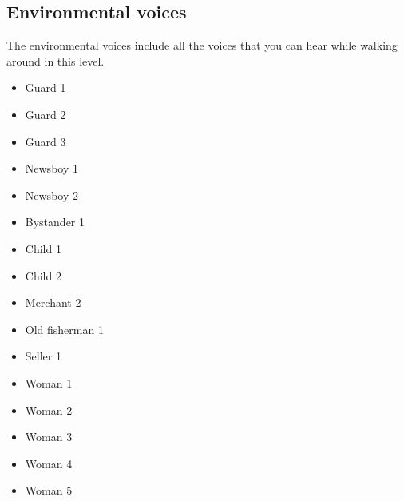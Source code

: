 \subsection{Environmental voices}
The environmental voices include all the voices that you can hear while walking around in this level.
\begin{itemize}
	\item Guard 1
	\item Guard 2
	\item Guard 3
	\item Newsboy 1
	\item Newsboy 2
	\item Bystander 1
	\item Child 1
	\item Child 2
	\item Merchant 2
	\item Old fisherman 1
	\item Seller 1
	\item Woman 1
	\item Woman 2
	\item Woman 3
	\item Woman 4
	\item Woman 5
\end{itemize}
